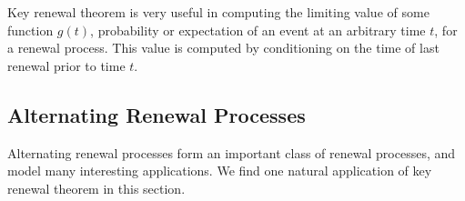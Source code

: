 \documentclass[a4paper,10pt,english]{article}
\begin{document}
Key renewal theorem is very useful in computing the limiting value of some function $g(t)$, probability or expectation of an event at an arbitrary time $t$, for a renewal process. This value is computed by conditioning on the time of last renewal prior to time $t$.

%

\subsection{Alternating Renewal Processes}
Alternating renewal processes form an important class of renewal processes, and model many interesting applications. 
We find one natural application of  key renewal theorem  in this section. 
\end{document}
